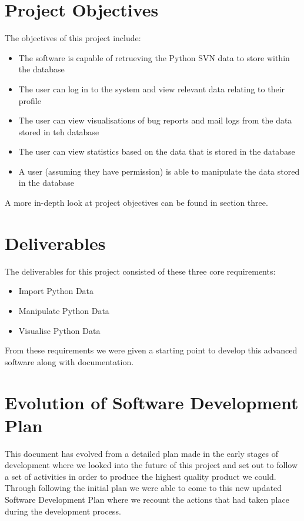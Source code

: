 \section{Project Objectives}

The objectives of this project include:

\begin{itemize}
	\item The software is capable of retrueving the Python SVN data to store within the database
	\item The user can log in to the system and view relevant data relating to their profile
	\item The user can view visualisations of bug reports and mail logs from the data stored in teh database
	\item The user can view statistics based on the data that is stored in the database
	\item A user (assuming they have permission) is able to manipulate the data stored in the database
\end{itemize}

A more in-depth look at project objectives can be found in section three.


\section{Deliverables}

The deliverables for this project consisted of these three core requirements:

\begin{itemize}
	\item Import Python Data
	\item Manipulate Python Data
	\item Visualise Python Data
\end{itemize}

From these requirements we were given a starting point to develop this advanced software along with documentation.


\section{Evolution of Software Development Plan}

This document has evolved from a detailed plan made in the early stages of development where we looked into the future of this project and set out to follow a set of activities in order to produce the highest quality product we could. Through following the initial plan we were able to come to this new updated Software Development Plan where we recount the actions that had taken place during the development process.

